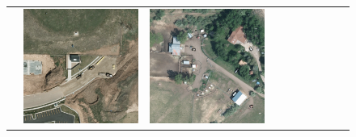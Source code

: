 \begin{figure}[h!]
\begin{tabularx}{\textwidth}{c|*{9}{X}}
    & \includegraphics[trim={440pt 360pt 460pt 555pt},clip,width=\linewidth]{images/015Results/01abb_vs_obb/comp_images/ground_truth_obb/427.png}
    & \includegraphics[trim={740pt 420pt 180pt 510pt},clip,width=\linewidth]{images/015Results/01abb_vs_obb/comp_images/ground_truth_obb/523.png}

\end{tabularx}
\end{figure}
